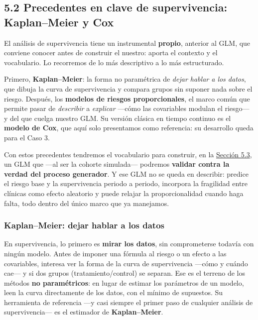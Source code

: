 \documentclass[
  letterpaper,
  DIV=11,
  numbers=noendperiod]{scrartcl}
\begin{document}
\hypertarget{sec-u15-ph}{%
\subsection{5.2 Precedentes en clave de supervivencia: Kaplan--Meier y
Cox}\label{sec-u15-ph}}

El análisis de supervivencia tiene un instrumental \textbf{propio},
anterior al GLM, que conviene conocer antes de construir el nuestro:
aporta el contexto y el vocabulario. Lo recorremos de lo más descriptivo
a lo más estructurado.

Primero, \textbf{Kaplan--Meier}: la forma no paramétrica de \emph{dejar
hablar a los datos}, que dibuja la curva de supervivencia y compara
grupos sin suponer nada sobre el riesgo. Después, los \textbf{modelos de
riesgos proporcionales}, el marco común que permite pasar de
\emph{describir} a \emph{explicar} ---cómo las covariables modulan el
riesgo--- y del que cuelga nuestro GLM. Su versión clásica en tiempo
continuo es el \textbf{modelo de Cox}, que aquí solo presentamos como
referencia: su desarrollo queda para el Caso 3.

Con estos precedentes tendremos el vocabulario para construir, en la
\protect\hyperlink{sec-u15-glm}{Sección 5.3}, un GLM que ---al ser la
cohorte simulada--- podremos \textbf{validar contra la verdad del
proceso generador}. Y ese GLM no se queda en describir: predice el
riesgo base y la supervivencia periodo a periodo, incorpora la
fragilidad entre clínicas como efecto aleatorio y puede relajar la
proporcionalidad cuando haga falta, todo dentro del único marco que ya
manejamos.

\hypertarget{sec-u15-km}{%
\subsubsection{Kaplan--Meier: dejar hablar a los
datos}\label{sec-u15-km}}

En supervivencia, lo primero es \textbf{mirar los datos}, sin
comprometerse todavía con ningún modelo. Antes de imponer una fórmula al
riesgo o un efecto a las covariables, interesa ver la forma de la curva
de supervivencia ---cómo y cuándo cae--- y si dos grupos
(tratamiento/control) se separan. Ese es el terreno de los métodos
\textbf{no paramétricos}: en lugar de estimar los parámetros de un
modelo, leen la curva directamente de los datos, con el mínimo de
supuestos. Su herramienta de referencia ---y casi siempre el primer paso
de cualquier análisis de supervivencia--- es el estimador de
\textbf{Kaplan--Meier}.
\end{document}
